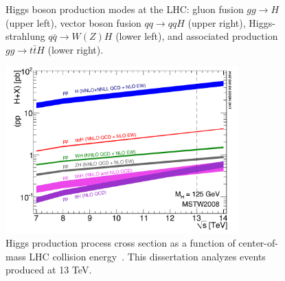 \begin{figure}[htbp]
{    %
    \caption[Higgs boson production modes at the LHC]{Higgs boson production modes at the LHC:
      gluon fusion $gg\to{}H$ (upper left), vector boson fusion $qq\to{}qqH$ (upper right),
      Higgs-strahlung $q\bar{q}\to{}W(Z)H$ (lower left), and associated
      production $gg\to{}t\bar{t}H$ (lower right).}
    \label{fig:higgs_production}}
\end{figure}

\begin{figure}[hbtp]
 \begin{center}
   \includegraphics[width=0.8\textwidth]{ch2_figs/higgs_prod_xsec.pdf}
   \caption[Higgs production cross section vs LHC collision energy]{Higgs production process cross section as a function of center-of-mass LHC collision energy~\cite{lhchxswg}.
     This dissertation analyzes events produced at 13 TeV.}
   \label{fig:higgs_prod_plot}
 \end{center}
\end{figure}


